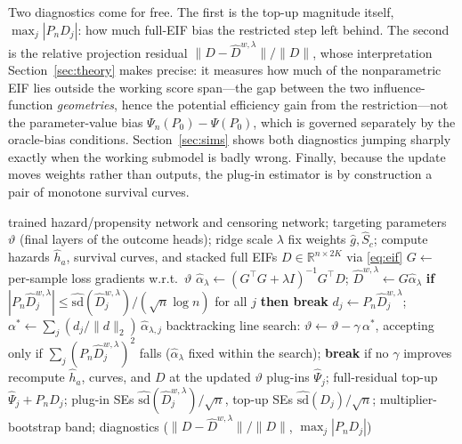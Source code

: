 \documentclass[11pt]{article}
\theoremstyle{remark}
\newcommand{\Pn}{P_n}
\begin{document}
Two diagnostics come for free. The first is the top-up magnitude itself, $\max_j |\Pn D_j|$: how much full-EIF bias the restricted step left behind. The second is the relative projection residual $\|D - \widehat D^{w,\lambda}\|/\|D\|$, whose interpretation Section~\ref{sec:theory} makes precise: it measures how much of the nonparametric EIF lies outside the working score span---the gap between the two influence-function \emph{geometries}, hence the potential efficiency gain from the restriction---not the parameter-value bias $\Psi_n(P_0) - \Psi(P_0)$, which is governed separately by the oracle-bias conditions. Section~\ref{sec:sims} shows both diagnostics jumping sharply exactly when the working submodel is badly wrong. Finally, because the update moves weights rather than outputs, the plug-in estimator is by construction a pair of monotone survival curves.

\begin{algorithm}[t]
\caption{TDSC universal targeting (no-split form)}
\label{alg:tdsc}
\begin{algorithmic}[1]
\Require trained hazard/propensity network and censoring network; targeting parameters $\vartheta$ (final layers of the outcome heads); ridge scale $\lambda$
\State fix weights $\hat g, \hat S_c$; compute hazards $\hat h_a$, survival curves, and stacked full EIFs $D\in\mathbb{R}^{n\times2K}$ via \eqref{eq:eif}
\Loop
    \State $G \gets$ per-sample loss gradients w.r.t.\ $\vartheta$ 
    \State $\widehat\alpha_\lambda \gets (G^\top G + \lambda I)^{-1} G^\top D$; \quad $\widehat D^{w,\lambda} \gets G\widehat\alpha_\lambda$ 
    \State \textbf{if} $|\Pn \widehat D^{w,\lambda}_j| \le \widehat{\mathrm{sd}}(\widehat D^{w,\lambda}_j)/(\sqrt n\log n)$ for all $j$ \textbf{then break} 
    \State $d_j \gets \Pn \widehat D^{w,\lambda}_j$; \quad $\alpha^\ast \gets \sum_j (d_j / \lVert d\rVert_2)\, \widehat\alpha_{\lambda,j}$ 
    \State backtracking line search: $\vartheta \gets \vartheta - \gamma\,\alpha^\ast$, accepting only if $\sum_j (\Pn \widehat D^{w,\lambda}_j)^2$ falls ($\widehat\alpha_\lambda$ fixed within the search); \textbf{break} if no $\gamma$ improves
    \State recompute $\hat h_a$, curves, and $D$ at the updated $\vartheta$
\EndLoop
\State \Return plug-ins $\widehat\Psi_j$; full-residual top-up $\widehat\Psi_j + \Pn D_j$; plug-in SEs $\widehat{\mathrm{sd}}(\widehat D^{w,\lambda}_j)/\sqrt n$, top-up SEs $\widehat{\mathrm{sd}}(D_j)/\sqrt n$; multiplier-bootstrap band; diagnostics ($\lVert D - \widehat D^{w,\lambda}\rVert/\lVert D\rVert$, $\max_j|\Pn D_j|$)
\end{algorithmic}
\end{algorithm}
\end{document}
